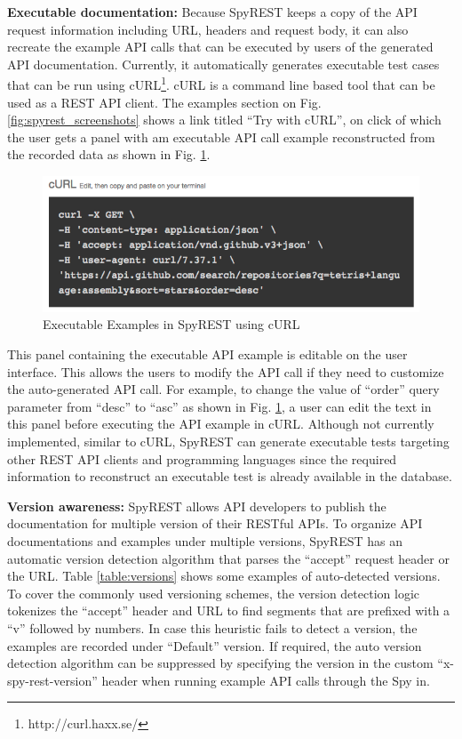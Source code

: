\documentclass[conference]{IEEEtran}
\begin{document}
\textbf{Executable documentation:} Because SpyREST keeps a copy of the API request information including URL, headers and request body, it can also recreate the example API calls that can be executed by users of the generated API documentation. Currently, it automatically generates executable test cases that can be run using cURL\footnote{http://curl.haxx.se/}. cURL is a command line based tool that can be used as a REST API client. The examples section on Fig. \ref{fig:spyrest_screenshots} shows a link titled ``Try with cURL'', on click of which the user gets a panel with am executable API call example reconstructed from the recorded data as shown in Fig. \ref{fig:curl}.

\begin{figure}[!tbh]
  \centering
  \includegraphics[width=\linewidth]{curl.png}
  \caption{Executable Examples in SpyREST using cURL}
  \label{fig:curl}
\end{figure}

This panel containing the executable API example is editable on the user interface. This allows the users to modify the API call if they need to customize the auto-generated API call. For example, to change the value of ``order'' query parameter from ``desc'' to ``asc''  as shown in Fig. \ref{fig:curl}, a user can edit the text in this panel before executing the API example in cURL. Although not currently implemented, similar to cURL, SpyREST can generate executable tests targeting other REST API clients and programming languages since the required information to reconstruct an executable test is already available in the database.

\textbf{Version awareness:} SpyREST allows API developers to publish the documentation for multiple version of their RESTful APIs. To organize API documentations and examples under multiple versions, SpyREST has an automatic version detection algorithm that parses the ``accept'' request header or the URL. Table \ref{table:versions} shows some examples of auto-detected versions. To cover the commonly used versioning schemes, the version detection logic tokenizes the ``accept'' header and URL to find segments that are prefixed with a ``v'' followed by numbers. In case this heuristic fails to detect a version, the examples are recorded under ``Default'' version. If required, the auto version detection algorithm can be suppressed by specifying the version in the custom ``x-spy-rest-version'' header when running example API calls through the Spy in.
\end{document}

